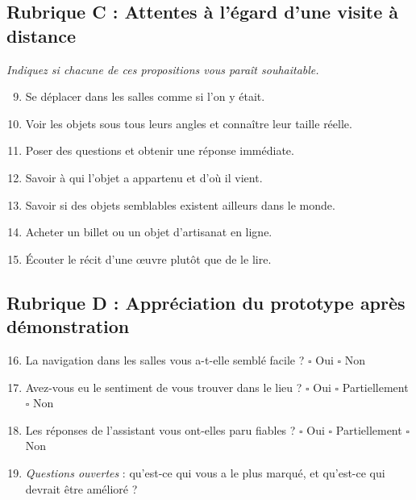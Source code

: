 \subsection*{Rubrique C : Attentes à l'égard d'une visite à distance}

\emph{Indiquez si chacune de ces propositions vous paraît souhaitable.}

\begin{enumerate}\setcounter{enumi}{8}
  \item Se déplacer dans les salles comme si l'on y était.
  \item Voir les objets sous tous leurs angles et connaître leur taille réelle.
  \item Poser des questions et obtenir une réponse immédiate.
  \item Savoir à qui l'objet a appartenu et d'où il vient.
  \item Savoir si des objets semblables existent ailleurs dans le monde.
  \item Acheter un billet ou un objet d'artisanat en ligne.
  \item Écouter le récit d'une œuvre plutôt que de le lire.
\end{enumerate}

\subsection*{Rubrique D : Appréciation du prototype après démonstration}

\begin{enumerate}\setcounter{enumi}{15}
  \item La navigation dans les salles vous a-t-elle semblé facile ? \quad
        $\square$ Oui \quad $\square$ Non
  \item Avez-vous eu le sentiment de vous trouver dans le lieu ? \quad
        $\square$ Oui \quad $\square$ Partiellement \quad $\square$ Non
  \item Les réponses de l'assistant vous ont-elles paru fiables ? \quad
        $\square$ Oui \quad $\square$ Partiellement \quad $\square$ Non
  \item \emph{Questions ouvertes} : qu'est-ce qui vous a le plus marqué, et
        qu'est-ce qui devrait être amélioré ?
\end{enumerate}

